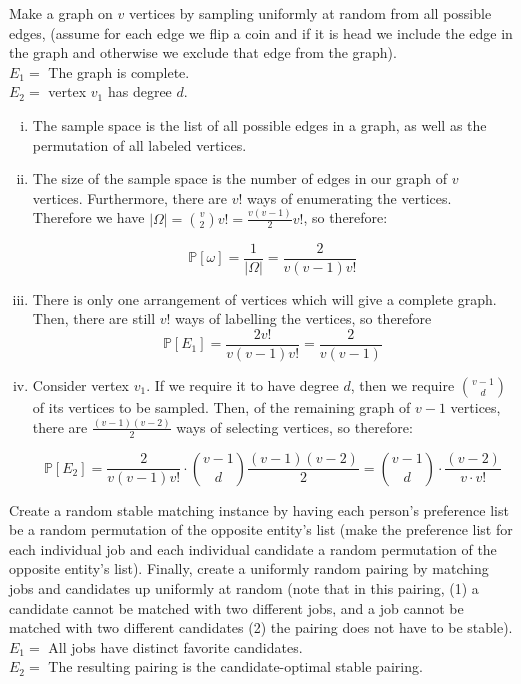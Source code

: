 \documentclass[11pt]{article}
\begin{document}
\begin{Parts}
    \Part Make a graph on $v$ vertices by sampling uniformly at random from all possible edges, (assume for each edge we flip a coin and if it is head we include the edge in the graph and otherwise we exclude that edge from the graph).\\
    $E_1 =$ The graph is complete.\\
    $E_2 =$ vertex $v_1$ has degree $d$.


    \begin{solution}
      \begin{enumerate}[i.]
        \item The sample space is the list of all possible edges in a graph, as well as the permutation of all labeled vertices. 
        \item The size of the sample space is the number of edges in our graph of $v$ vertices. Furthermore, there are $v!$ ways of enumerating the vertices. Therefore we have $ |\Omega| = {v \choose 2} v! = \frac{v(v-1)}{2}v!$, so therefore: 
        
        \[ \mathbb P[\omega] = \frac{1}{|\Omega|} = \frac{2}{v(v-1)v!}\]

        \item There is only one arrangement of vertices which will give a complete graph. Then, there are still $v!$ ways of labelling the vertices, so therefore 
        \[ \mathbb P[E_1] = \frac{2v!}{v(v-1)v!} = \frac{2}{v(v-1)}\]

        \item Consider vertex $v_1$. If we require it to have degree $d$, then we require ${v-1 \choose d}$ of its vertices to be sampled. Then, of the remaining graph of $v-1$ vertices, there are $\frac{(v-1)(v-2)}{2}$ ways of selecting vertices, so therefore: 
        
        \[ \mathbb P[E_2] = \frac{2}{v(v-1)v!} \cdot {v-1 \choose d} \frac{(v-1)(v-2)}{2} = {v-1\choose d}  \cdot \frac{(v-2)}{v\cdot v!}\]
      \end{enumerate}
    \end{solution}

    \Part Create a random stable matching instance by having each person's
    preference list be a random permutation of the opposite entity's list (make the preference list for each individual job and each individual candidate a random permutation of the opposite entity's list). Finally, create a uniformly random pairing by matching jobs and candidates up uniformly at random (note that in this pairing, (1) a candidate cannot be matched with two different jobs, and a job cannot be matched with two different candidates (2) the pairing does not have to be stable).\\
     $E_1 =$ All jobs have distinct favorite candidates.\\
     $E_2 =$ The resulting pairing is the candidate-optimal stable pairing.



\end{Parts}
\end{document}
